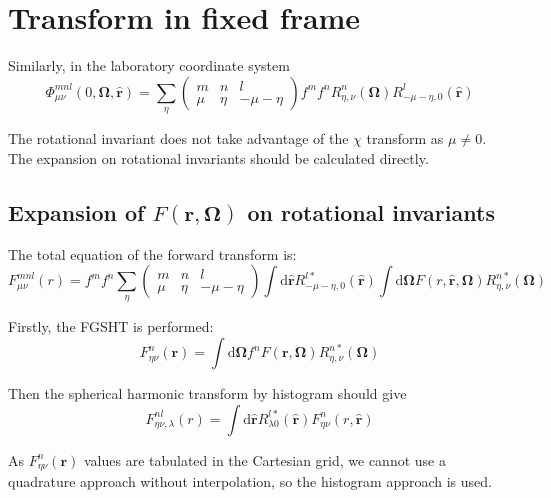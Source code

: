 \section{Transform in fixed frame}

Similarly, in the laboratory coordinate system
\begin{equation}
\Phi_{\mu\nu}^{mnl}(0,\mathbf{\Omega},\mathbf{\hat{r}})=\sum_{\eta}\left(\begin{array}{ccc}
m & n & l\\
\mu & \eta & -\mu-\eta
\end{array}\right)f^{m}f^{n}R_{\eta,\nu}^{n}(\mathbf{\Omega})R_{-\mu-\eta,0}^{l}(\mathbf{\hat{r}})\label{eq:phi_global}
\end{equation}

The rotational invariant does not take advantage of the $\chi$ transform
as $\mu\neq0$. The expansion on rotational invariants should be calculated
directly.

\subsection*{Expansion of $F(\mathbf{r},\mathbf{\Omega})$ on rotational invariants}

The total equation of the forward transform is:
\begin{equation}
F_{\mu\nu}^{mnl}(r)=f^{m}f^{n}\sum_{\eta}\left(\begin{array}{ccc}
m & n & l\\
\mu & \eta & -\mu-\eta
\end{array}\right)\int\mathrm{d}\hat{\mathbf{r}}R_{-\mu-\eta,0}^{l*}(\mathbf{\hat{r}})\int\mathrm{d}\mathbf{\Omega}F(r,\hat{\mathbf{r}},\mathbf{\Omega})R_{\eta,\nu}^{n*}(\mathbf{\Omega})
\end{equation}

Firstly, the \acs{FGSHT} is performed:
\begin{equation}
F_{\eta\nu}^{n}(\mathbf{r})=\int\mathrm{d}\mathbf{\Omega}f^{n}F(\mathbf{r},\mathbf{\Omega})R_{\eta,\nu}^{n*}(\mathbf{\Omega})
\end{equation}

Then the spherical harmonic transform by histogram should give
\begin{equation}
F_{\eta\nu,\lambda}^{nl}(r)=\int\mathrm{d}\hat{\mathbf{r}}R_{\lambda0}^{l*}(\mathbf{\hat{r}})F_{\eta\nu}^{n}(r,\mathbf{\hat{r}})\label{eq:sht-1}
\end{equation}

As $F_{\eta\nu}^{n}(\mathbf{r})$ values are tabulated in the Cartesian
grid, we cannot use a quadrature approach without interpolation, so
the histogram approach is used.

